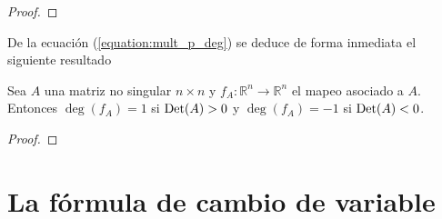 \documentclass[12pt]{report}
\theoremstyle{largebreak}
\newcommand{\Det}{\textup{Det}}
\begin{document}
    \begin{proof}
        
    \end{proof}

    De la ecuación (\ref{equation:mult_p_deg}) se deduce de forma inmediata el siguiente resultado

    \begin{theor}
        Sea $A$ una matriz no singular $n\times n$ y $f_A:\mathbb{R}^n\rightarrow \mathbb{R}^n$ el mapeo asociado a $A$. Entonces $\deg(f_A)=1$ si $\Det(A)>0$ y $\deg(f_A)=-1$ si $\Det(A)<0$.
    \end{theor}

    \begin{proof}
        
    \end{proof}

    \section{La fórmula de cambio de variable}
\end{document}
